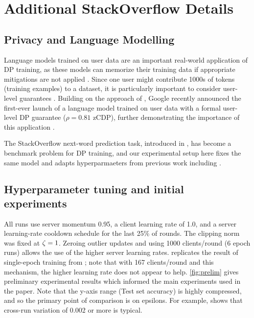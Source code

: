 \documentclass{article} %
\theoremstyle{named}
\begin{document}
\clearpage
\section{Additional StackOverflow Details}\label{sec:addl_stackoverflow}
\subsection{Privacy and Language Modelling}\label{app:ssec:sonwp-history}
Language models trained on user data are an important real-world application of DP training, as these models can memorize their training data if appropriate mitigations are not applied \citep{carlini19secret,song2019auditing,carlini21extracting}.  Since one user might contribute 1000s of tokens (training examples) to a dataset, it is particularly important to consider user-level guarantees  \citep{mcmahan2017learning}. Building on the approach of \citet{kairouz2021practical}, Google recently announced the first-ever launch of a language model trained on user data with a formal user-level DP guarantee ($\rho=0.81$ zCDP), further demonstrating the importance of this application \citep{mcmahan2022dpftrlblog}.

The StackOverflow next-word prediction task, introduced in \citep{reddi20adaptive}, has become a benchmark problem for DP training, and our experimental setup here fixes the same model and adapts hyperparmaeters from previous work including \citet{kairouz2021practical,denisov22matfact}.


\subsection{Hyperparameter tuning and initial experiments}\label{app:ssec:sonwp-setup}
All runs use server momentum 0.95, a client learning rate of 1.0, and a server learning-rate cooldown schedule for the last 25\% of rounds. The clipping norm was fixed at $\zeta=1$. Zeroing outlier updates and using 1000 clients/round (6 epoch runs) allows the use of the higher server learning rates. \OneEpochOne replicates the result of single-epoch training from \citet{denisov22matfact}; note that with 167 clients/round and this mechanism, the higher learning rate does not appear to help.
\cref{fig:prelim} gives preliminary experimental results which informed the main experiments used in the paper. Note that the y-axis range (Test set accuracy) is highly compressed, and so the primary point of comparison is on epsilons. For example, \citet{denisov22matfact} shows that cross-run variation of 0.002 or more is typical.
\end{document}
